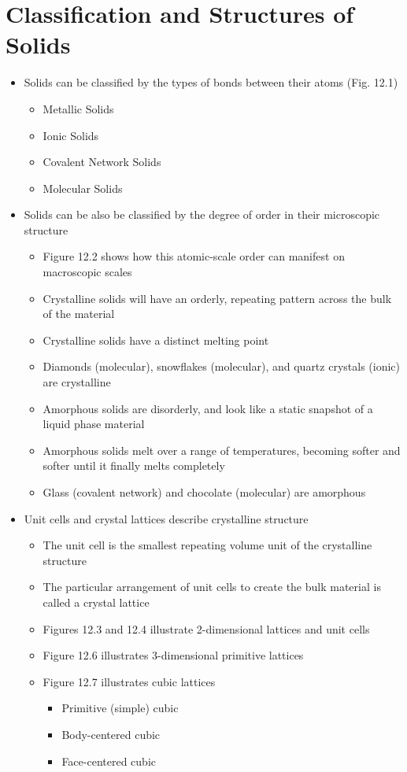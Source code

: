 \documentclass[12pt, openany, letterpaper]{memoir}
\begin{document}
\section{Classification and Structures of Solids}
\begin{itemize}
  \item Solids can be classified by the types of bonds between their atoms (Fig. 12.1)
  \begin{itemize}
    \item Metallic Solids
    \item Ionic Solids
    \item Covalent Network Solids
    \item Molecular Solids
  \end{itemize}
	\item Solids can be also be classified by the degree of order in their microscopic structure
	\begin{itemize}
    \item Figure 12.2 shows how this atomic-scale order can manifest on macroscopic scales
		\item Crystalline solids will have an orderly, repeating pattern across the bulk of the material
		\item Crystalline solids have a distinct melting point
		\item Diamonds (molecular), snowflakes (molecular), and quartz crystals (ionic) are crystalline 
		\item Amorphous solids are disorderly, and look like a static snapshot of a liquid phase material
		\item Amorphous solids melt over a range of temperatures, becoming softer and softer until it finally melts completely
		\item Glass (covalent network) and chocolate (molecular) are amorphous
	\end{itemize}
  \item Unit cells and crystal lattices describe crystalline structure
  \begin{itemize}
    \item The unit cell is the smallest repeating volume unit of the crystalline structure
    \item The particular arrangement of unit cells to create the bulk material is called a crystal lattice 
    \item Figures 12.3 and 12.4 illustrate 2-dimensional lattices and unit cells
    \item Figure 12.6 illustrates 3-dimensional primitive lattices
    \item Figure 12.7 illustrates cubic lattices
    \begin{itemize}
      \item Primitive (simple) cubic
      \item Body-centered cubic
      \item Face-centered cubic
    \end{itemize}
  \end{itemize}
\end{itemize}
	
\end{document}
